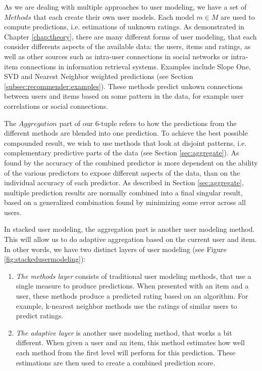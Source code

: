 As we are dealing with multiple approaches to user modeling, we have a set of $Methods$ that each create their own
user models. 
Each model $m \in M$ are used to compute predictions, i.e. estimations of unknown ratings.
As demonstrated in Chapter \ref{chap:theory}, there are many different forms of user modeling,
that each consider differents aspects of the available data: the users, items and ratings, as well as 
other sources such as intra-user connections in social networks or intra-item connections in information retrieval systems.
Examples include Slope One, SVD and Nearest Neighbor weighted predictions
(see Section \ref{subsec:recommender:examples}).
These methods predict unkown connections between users and items based on some pattern in the data,
for example user correlations or social connections.

The $Aggregation$ part of our 6-tuple refers to how the predictions from the different methods are blended
into one prediction. 
To achieve the best possible compounded result, we wish to use methods that look at disjoint patterns, 
i.e. complementary predictive parts of the data (see Section \ref{sec:aggregate}).
As found by \citet[p6]{Bell2007} the accuracy of the combined predictor is more dependent on the 
ability of the various predictors to expose different aspects of the data, than on 
the individual accuracy of each predictor.
As described in Section \ref{sec:aggregate}, multiple prediction results are normally 
combined into a final singular result,
based on a generalized combination found by minimizing some error across all users.

In stacked user modeling, the aggregation part is another user modeling method.
This will allow us to do adaptive aggregation based on the current user and item.
In other words, we have two distinct layers of user modeling 
(see Figure \ref{fig:stackedusermodeling}):

\begin{enumerate}
  \item
    \emph{The methods layer} consists of traditional user modeling methods, that use a single measure to produce predictions.
    When presented with an item and a user, these methods produce a predicted rating based on an algorithm.
    For example, k-nearest neighbor methods use the ratings of similar users to predict ratings.
  \item
    \emph{The adaptive layer} is another user modeling method, that works a bit different.
    When given a user and an item, this method estimates how well each method
    from the first level will perform for this prediction.
    These estimations are then used to create a combined prediction score.
    
\end{enumerate}

